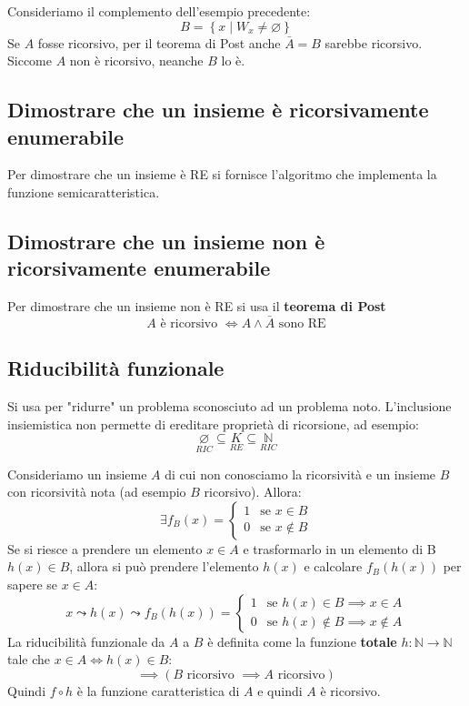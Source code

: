 \documentclass[a4paper]{article}
\begin{document}
\begin{example}
  Consideriamo il complemento dell'esempio precedente:
  \[
    B = \left\{ \left. x \;\right|\; W_x \neq \varnothing \right\}
  \] 
  Se \( A \) fosse ricorsivo, per il teorema di Post anche \( \bar{A} = B \) sarebbe ricorsivo.
  Siccome \( A \) non è ricorsivo, neanche \( B \) lo è.
\end{example}

\subsection{Dimostrare che un insieme è ricorsivamente enumerabile}
Per dimostrare che un insieme è RE si fornisce l'algoritmo che implementa la
funzione semicaratteristica.

\subsection{Dimostrare che un insieme non è ricorsivamente enumerabile}
Per dimostrare che un insieme non è RE si usa il \textbf{teorema di Post}
\[
  A \text{ è ricorsivo } \iff A \wedge \bar{A} \text{ sono RE}
\] 

\subsection{Riducibilità funzionale}
Si usa per "ridurre" un problema sconosciuto ad un problema noto.
L'inclusione insiemistica non permette di ereditare proprietà di ricorsione, ad
esempio:
\[
  \underset{RIC}{\varnothing} \subseteq \underset{RE}{K} \subseteq \underset{RIC}{\mathbb{N}}
\] 

\vspace{1em}
\noindent
Consideriamo un insieme \( A \) di cui non conosciamo la ricorsività e un
insieme \( B \) con ricorsività nota (ad esempio \( B \) ricorsivo). Allora:
\[
  \exists f_B(x) =
  \begin{cases}
    1 & \text{se } x \in B \\
    0 & \text{se } x \notin B
  \end{cases}
\] 
Se si riesce a prendere un elemento \( x \in A \) e trasformarlo in un elemento
di B \( h(x) \in B \), allora si può prendere l'elemento \( h(x) \) e calcolare
\( f_B(h(x)) \) per sapere se \( x \in A \):
\[
   x \leadsto h(x) \leadsto f_B(h(x)) =
  \begin{cases}
    1 & \text{se } h(x) \in B \implies x \in A \\
    0 & \text{se } h(x) \notin B \implies x \notin A
  \end{cases}
\] 
La riducibilità funzionale da \( A \) a \( B \) è definita come
la funzione \textbf{totale} \( h: \mathbb{N} \to \mathbb{N} \) tale che
\( x \in A \iff h(x) \in B \):
\[
  \implies (B \text{ ricorsivo } \implies A \text{ ricorsivo})
\] 
Quindi \( f \circ h \) è la funzione caratteristica di \( A \) e
quindi \( A \) è ricorsivo.
\end{document}
